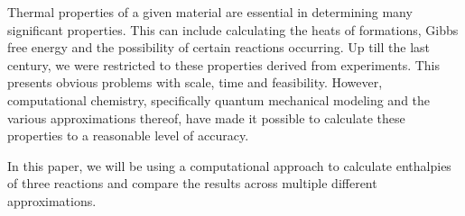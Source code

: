 Thermal properties of a given material are essential in determining many significant properties. This can include calculating the heats of formations, Gibbs free energy and the possibility of certain reactions occurring. Up till the last century, we were restricted to these properties derived from experiments. This presents obvious problems with scale, time and feasibility. However, computational chemistry, specifically quantum mechanical modeling and the various approximations thereof, have made it possible to calculate these properties to a reasonable level of accuracy.

In this paper, we will be using a computational approach to calculate enthalpies of three reactions and compare the results across multiple different approximations.
